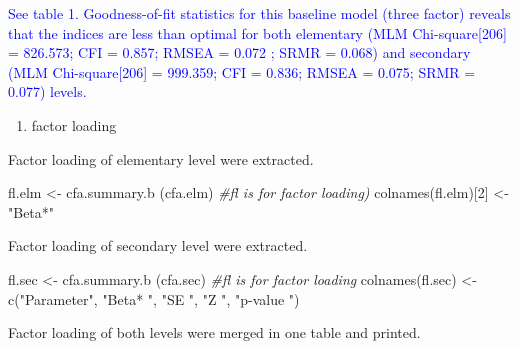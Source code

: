 \documentclass[
]{article}
\newenvironment{Shaded}{\begin{snugshade}}{\end{snugshade}}
\newcommand{\CommentTok}[1]{\textcolor[rgb]{0.56,0.35,0.01}{\textit{#1}}}
\newcommand{\DecValTok}[1]{\textcolor[rgb]{0.00,0.00,0.81}{#1}}
\newcommand{\FunctionTok}[1]{\textcolor[rgb]{0.00,0.00,0.00}{#1}}
\newcommand{\NormalTok}[1]{#1}
\newcommand{\OtherTok}[1]{\textcolor[rgb]{0.56,0.35,0.01}{#1}}
\newcommand{\StringTok}[1]{\textcolor[rgb]{0.31,0.60,0.02}{#1}}
\providecommand{\tightlist}{%
  \setlength{\itemsep}{0pt}\setlength{\parskip}{0pt}}
\begin{document}
\textcolor{blue}{See table 1. Goodness-of-fit statistics for this baseline model (three factor) reveals that the indices are less than optimal for both elementary (MLM Chi-square[206] = 826.573; CFI = 0.857; RMSEA = 0.072 ; SRMR = 0.068) and secondary (MLM Chi-square[206] = 999.359; CFI = 0.836; RMSEA = 0.075; SRMR = 0.077) levels.}

\begin{enumerate}
\def\labelenumi{(\arabic{enumi})}
\setcounter{enumi}{1}
\tightlist
\item
  factor loading
\end{enumerate}

Factor loading of elementary level were extracted.

\begin{Shaded}
\begin{Highlighting}[]
\NormalTok{fl.elm }\OtherTok{\textless{}{-}} \FunctionTok{cfa.summary.b}\NormalTok{ (cfa.elm) }\CommentTok{\#fl  is for factor loading)}
\FunctionTok{colnames}\NormalTok{(fl.elm)[}\DecValTok{2}\NormalTok{] }\OtherTok{\textless{}{-}} \StringTok{"Beta*"}
\end{Highlighting}
\end{Shaded}

Factor loading of secondary level were extracted.

\begin{Shaded}
\begin{Highlighting}[]
\NormalTok{fl.sec }\OtherTok{\textless{}{-}} \FunctionTok{cfa.summary.b}\NormalTok{ (cfa.sec) }\CommentTok{\#fl is for factor loading}
\FunctionTok{colnames}\NormalTok{(fl.sec) }\OtherTok{\textless{}{-}} \FunctionTok{c}\NormalTok{(}\StringTok{"Parameter"}\NormalTok{,}
                     \StringTok{"Beta* "}\NormalTok{,}
                     \StringTok{"SE "}\NormalTok{,}
                     \StringTok{"Z "}\NormalTok{,}
                     \StringTok{"p{-}value "}\NormalTok{)}
\end{Highlighting}
\end{Shaded}

Factor loading of both levels were merged in one table and printed.
\end{document}
